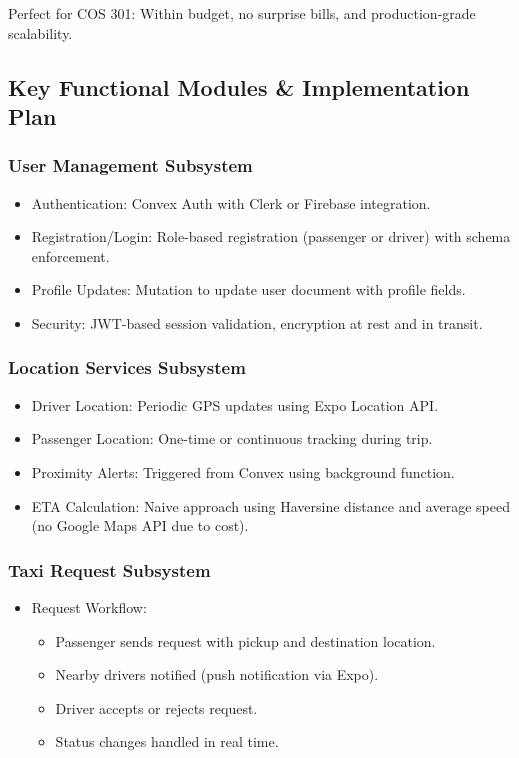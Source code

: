 \documentclass[a4paper,12pt]{article}
\begin{document}
\noindent Perfect for COS 301: Within budget, no surprise bills, and production-grade scalability.

\subsection{Key Functional Modules \& Implementation Plan}

\subsubsection*{User Management Subsystem}
\begin{itemize}
    \item Authentication: Convex Auth with Clerk or Firebase integration.
    \item Registration/Login: Role-based registration (passenger or driver) with schema enforcement.
    \item Profile Updates: Mutation to update user document with profile fields.
    \item Security: JWT-based session validation, encryption at rest and in transit.
\end{itemize}

\subsubsection*{Location Services Subsystem}
\begin{itemize}
    \item Driver Location: Periodic GPS updates using Expo Location API.
    \item Passenger Location: One-time or continuous tracking during trip.
    \item Proximity Alerts: Triggered from Convex using background function.
    \item ETA Calculation: Naive approach using Haversine distance and average speed (no Google Maps API due to cost).
\end{itemize}

\subsubsection*{Taxi Request Subsystem}
\begin{itemize}
    \item Request Workflow:
    \begin{itemize}
        \item Passenger sends request with pickup and destination location.
        \item Nearby drivers notified (push notification via Expo).
        \item Driver accepts or rejects request.
        \item Status changes handled in real time.
    \end{itemize}
\end{itemize}
\end{document}
